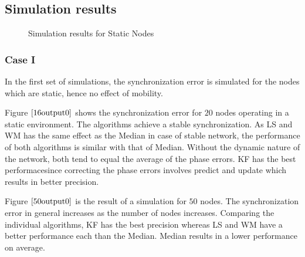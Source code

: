 \documentclass[journal]{IEEEtran}
\begin{document}
\subsection{\textbf{Simulation results}}
\begin{figure}
\centerline{
\hfil
{}}
\caption{Simulation results for Static Nodes }
\label{static}
\end{figure}
\subsubsection{\textbf{Case I}} 
In the first set of simulations, the synchronization error is simulated for the nodes which are static, hence no effect of mobility.
\par
Figure $\ref{16output0}$ shows the synchronization error for $20$
nodes operating in a static environment. The algorithms achieve a
stable synchronization. As LS and WM has the same effect as the
Median in case of stable network, the performance of both algorithms
is similar with that of Median. Without the dynamic nature of the
network, both tend to equal the average of the phase errors. KF has
the best performacesince correcting the phase errors involves
predict and update which results in better precision. \par
Figure $\ref{50output0}$ is the result of a simulation for $50$
nodes. The synchronization error in general increases as the number
of nodes increases. Comparing the individual algorithms, KF has the best
precision whereas LS and WM have a better performance
each than the Median. Median results in a lower performance on average.
\end{document}
